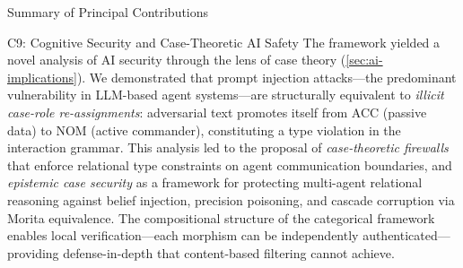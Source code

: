 \documentclass[
  ignorenonframetext,
]{beamer}
\begin{document}
\begin{frame}{Summary of Principal Contributions}
\begin{block}{C9: Cognitive Security and Case-Theoretic AI Safety}
\protect{}\label{c9-cognitive-security-and-case-theoretic-ai-safety}
The framework yielded a novel analysis of AI security through the lens
of case theory (\autoref{sec:ai-implications}). We demonstrated that
prompt injection attacks---the predominant vulnerability in LLM-based
agent systems---are structurally equivalent to \emph{illicit case-role
re-assignments}: adversarial text promotes itself from ACC (passive
data) to NOM (active commander), constituting a type violation in the
interaction grammar. This analysis led to the proposal of
\emph{case-theoretic firewalls} that enforce relational type constraints
on agent communication boundaries, and \emph{epistemic case security} as
a framework for protecting multi-agent relational reasoning against
belief injection, precision poisoning, and cascade corruption via Morita
equivalence. The compositional structure of the categorical framework
enables local verification---each morphism can be independently
authenticated---providing defense-in-depth that content-based filtering
cannot achieve.
\end{block}
\end{frame}
\end{document}
